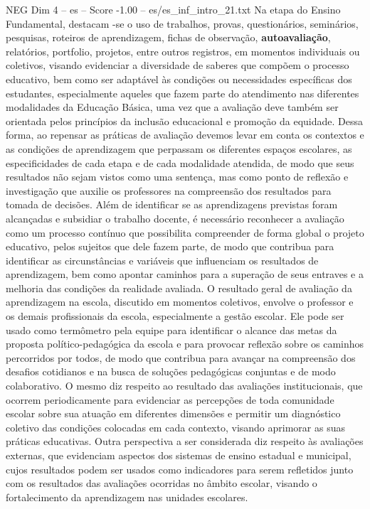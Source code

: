 \begin{textsample}{NEG Dim 4 – es – Score -1.00 – es/es\_inf\_intro\_21.txt}
Na etapa do Ensino Fundamental, destacam -se o uso de trabalhos, provas, questionários, seminários, pesquisas, roteiros de aprendizagem, fichas de observação, \textbf{autoavaliação}, relatórios, portfolio, projetos, entre outros registros, em momentos individuais ou coletivos, visando evidenciar a diversidade de saberes que compõem o processo educativo, bem como ser adaptável às condições ou necessidades específicas dos estudantes, especialmente aqueles que fazem parte do atendimento nas diferentes modalidades da Educação Básica, uma vez que a avaliação deve também ser orientada pelos princípios da inclusão educacional e promoção da equidade.
Dessa forma, ao repensar as práticas de avaliação devemos levar em conta os contextos e as condições de aprendizagem que perpassam os diferentes espaços escolares, as especificidades de cada etapa e de cada modalidade atendida, de modo que seus resultados não sejam vistos como uma sentença, mas como ponto de reflexão e investigação que auxilie os professores na compreensão dos resultados para tomada de decisões.
Além de identificar se as aprendizagens previstas foram alcançadas e subsidiar o trabalho docente, é necessário reconhecer a avaliação como um processo contínuo que possibilita compreender de forma global o projeto educativo, pelos sujeitos que dele fazem parte, de modo que contribua para identificar as circunstâncias e variáveis que influenciam os resultados de aprendizagem, bem como apontar caminhos para a superação de seus entraves e a melhoria das condições da realidade avaliada.
O resultado geral de avaliação da aprendizagem na escola, discutido em momentos coletivos, envolve o professor e os demais profissionais da escola, especialmente a gestão escolar.
Ele pode ser usado como termômetro pela equipe para identificar o alcance das metas da proposta político-pedagógica da escola e para provocar reflexão sobre os caminhos percorridos por todos, de modo que contribua para avançar na compreensão dos desafios cotidianos e na busca de soluções pedagógicas conjuntas e de modo colaborativo.
O mesmo diz respeito ao resultado das avaliações institucionais, que ocorrem periodicamente para evidenciar as percepções de toda comunidade escolar sobre sua atuação em diferentes dimensões e permitir um diagnóstico coletivo das condições colocadas em cada contexto, visando aprimorar as suas práticas educativas.
Outra perspectiva a ser considerada diz respeito às avaliações externas, que evidenciam aspectos dos sistemas de ensino estadual e municipal, cujos resultados podem ser usados como indicadores para serem refletidos junto com os resultados das avaliações ocorridas no âmbito escolar, visando o fortalecimento da aprendizagem nas unidades escolares.

\end{textsample}
